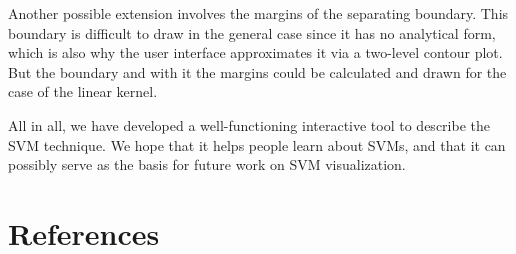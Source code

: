 \documentclass{scrartcl}
\begin{document}
Another possible extension involves the margins of the separating boundary.
This boundary is difficult to draw in the general case since it has no analytical form,
which is also why the user interface approximates it via a two-level contour plot.
But the boundary and with it the margins could be calculated and drawn
for the case of the linear kernel.

All in all, we have developed a well-functioning interactive tool to describe the SVM technique.
We hope that it helps people learn about SVMs,
and that it can possibly serve as the basis for future work on SVM visualization.

\section{References}
\end{document}
